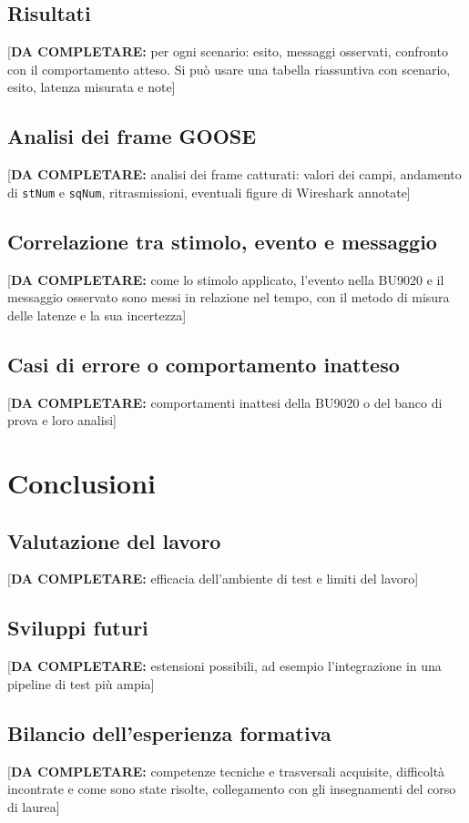 \documentclass[11pt,a4paper,italian,oneside,openany]{book}
\newcommand{\daf}[1]{{\color{red}[\textbf{DA COMPLETARE:} #1]}}
\begin{document}
\section{Risultati}
\daf{per ogni scenario: esito, messaggi osservati, confronto con il comportamento atteso. Si può usare una tabella riassuntiva con scenario, esito, latenza misurata e note}

\section{Analisi dei frame GOOSE}
\daf{analisi dei frame catturati: valori dei campi, andamento di \texttt{stNum} e \texttt{sqNum}, ritrasmissioni, eventuali figure di Wireshark annotate}

\section{Correlazione tra stimolo, evento e messaggio}
\daf{come lo stimolo applicato, l'evento nella BU9020 e il messaggio osservato sono messi in relazione nel tempo, con il metodo di misura delle latenze e la sua incertezza}

\section{Casi di errore o comportamento inatteso}
\daf{comportamenti inattesi della BU9020 o del banco di prova e loro analisi}

\chapter{Conclusioni}\label{cap:conclusioni}
\section{Valutazione del lavoro}
\daf{efficacia dell'ambiente di test e limiti del lavoro}

\section{Sviluppi futuri}
\daf{estensioni possibili, ad esempio l'integrazione in una pipeline di test più ampia}

\section{Bilancio dell'esperienza formativa}\label{sec:bilancio}
\daf{competenze tecniche e trasversali acquisite, difficoltà incontrate e come sono state risolte, collegamento con gli insegnamenti del corso di laurea}
\end{document}
